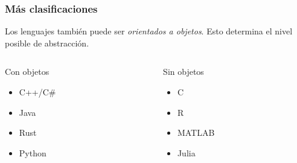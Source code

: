 \documentclass[14pt,aspectratio=169,xcolor=dvipsnames]{beamer}
\begin{document}
\begin{frame}\frametitle{Más clasificaciones}
Los lenguajes también puede ser \emph{orientados a objetos}. Esto determina el nivel posible de abstracción.
    \begin{columns}
        \begin{column}{0.45\textwidth}
            Con objetos
            \begin{itemize}
                \item C++/C\#
                \item Java
                \item Rust
                \item Python
            \end{itemize}
        \end{column}

        \begin{column}{0.45\textwidth}
            Sin objetos
            \begin{itemize}
                \item C
                \item R
                \item MATLAB
                \item Julia
            \end{itemize}
        \end{column}
    \end{columns}
\end{frame}
\end{document}
